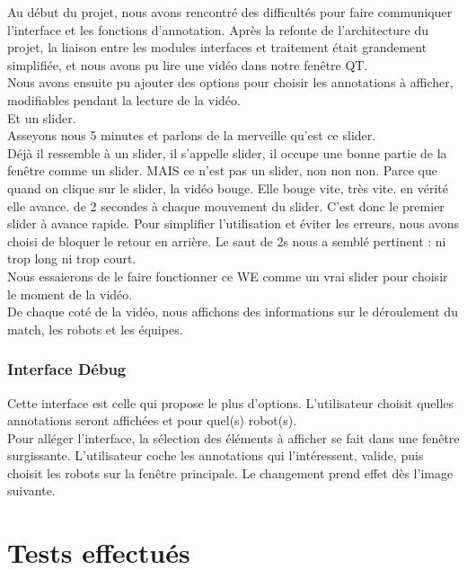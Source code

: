 \documentclass[a4paper,12pt]{report}
\begin{document}
Au début du projet, nous avons rencontré des difficultés pour faire communiquer l'interface et les fonctions d'annotation. Après la refonte de l'architecture du projet, la liaison entre les modules interfaces et traitement était grandement simplifiée, et nous avons pu lire une vidéo dans notre fenêtre QT. 
\\

Nous avons ensuite pu ajouter des options pour choisir les annotations à afficher, modifiables pendant la lecture de la vidéo. 
\\

Et un slider.
\\

Asseyons nous 5 minutes et parlons de la merveille qu'est ce slider. 
\\

Déjà il ressemble à un slider, il s'appelle slider, il occupe une bonne partie de la fenêtre comme un slider.
MAIS ce n'est pas un slider, non non non.
Parce que quand on clique sur le slider, la vidéo bouge. Elle bouge vite, très vite. en vérité elle avance. de 2 secondes à chaque mouvement du slider. C'est donc le premier slider à avance rapide. Pour simplifier l'utilisation et éviter les erreurs, nous avons choisi de bloquer le retour en arrière. Le saut de 2s nous a semblé pertinent : ni trop long ni trop court. 
\\

Nous essaierons de le faire fonctionner ce WE comme un vrai slider pour choisir le moment de la vidéo.
\\

De chaque coté de la vidéo, nous affichons des informations sur le déroulement du match, les robots et les équipes.




\subsection{Interface Débug}
Cette interface est celle qui propose le plus d'options. L'utilisateur choisit quelles annotations seront affichées et pour quel(s) robot(s). 
\\

Pour alléger l'interface, la sélection des éléments à afficher se fait dans une fenêtre surgissante. L'utilisateur coche les annotations qui l'intéressent, valide, puis choisit les robots sur la fenêtre principale. Le changement prend effet dès l'image suivante.  

\newpage
\chapter{Tests effectués}
\end{document}
